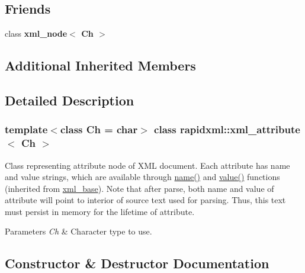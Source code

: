 \subsection*{Friends}
\begin{DoxyCompactItemize}
\item 
\mbox{\label{classrapidxml_1_1xml__attribute_aa7e464ce3fe512598ff8dda47291941f}} 
class {\bfseries xml\+\_\+node$<$ Ch $>$}
\end{DoxyCompactItemize}
\subsection*{Additional Inherited Members}


\subsection{Detailed Description}
\subsubsection*{template$<$class Ch = char$>$\newline
class rapidxml\+::xml\+\_\+attribute$<$ Ch $>$}

Class representing attribute node of X\+ML document. Each attribute has name and value strings, which are available through \mbox{\hyperlink{classrapidxml_1_1xml__base_aef8ae147fbee59209f714274afc80dc4}{name()}} and \mbox{\hyperlink{classrapidxml_1_1xml__base_a6af65de5e59ac497cd69838f8a89d602}{value()}} functions (inherited from \mbox{\hyperlink{classrapidxml_1_1xml__base}{xml\+\_\+base}}). Note that after parse, both name and value of attribute will point to interior of source text used for parsing. Thus, this text must persist in memory for the lifetime of attribute. 
\begin{DoxyParams}{Parameters}
{\em Ch} & Character type to use. \\
\hline
\end{DoxyParams}


\subsection{Constructor \& Destructor Documentation}
\mbox{\label{classrapidxml_1_1xml__attribute_a26be291103917d3e8de110d46dd83816}} 
